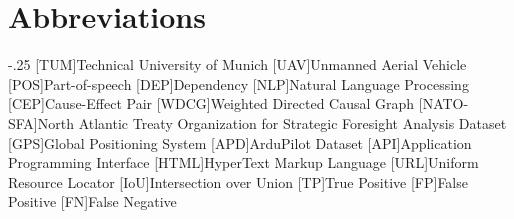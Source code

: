 \chapter{Abbreviations}\label{ch:abbreviations}
\begin{acronym}
    \itemsep-.25\baselineskip
    [TUM]{Technical University of Munich}
    [UAV]{Unmanned Aerial Vehicle}
    [POS]{Part-of-speech}
    [DEP]{Dependency}
    [NLP]{Natural Language Processing}
    [CEP]{Cause-Effect Pair}
    [WDCG]{Weighted Directed Causal Graph}
    [NATO-SFA]{North Atlantic Treaty Organization for Strategic Foresight Analysis Dataset}
    [GPS]{Global Positioning System}
    [APD]{ArduPilot Dataset}
    [API]{Application Programming Interface}
    [HTML]{HyperText Markup Language}
    [URL]{Uniform Resource Locator}
    [IoU]{Intersection over Union}
    [TP]{True Positive}
    [FP]{False Positive}
    [FN]{False Negative}
\end{acronym}
